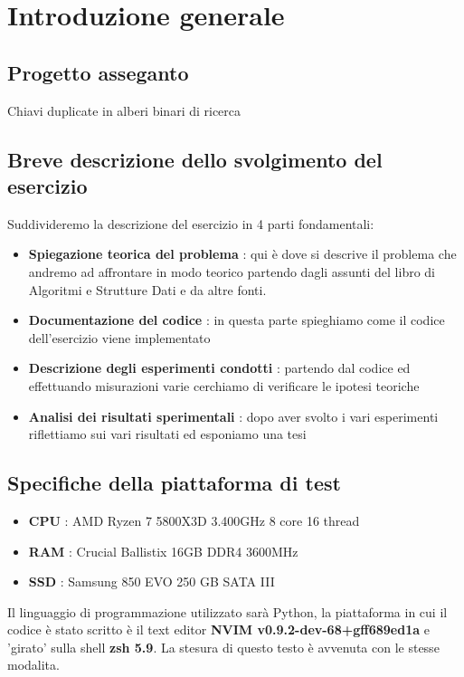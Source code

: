 \section{Introduzione generale}

\subsection{Progetto asseganto}

Chiavi duplicate in alberi binari di ricerca

\subsection{Breve descrizione dello svolgimento del esercizio}
Suddivideremo la descrizione del esercizio in 4 parti fondamentali:

\begin{itemize}
    \item \textbf{Spiegazione teorica del problema} : qui è dove si descrive il problema che andremo ad affrontare in modo teorico partendo dagli assunti del libro di Algoritmi e Strutture Dati e da altre fonti.
    \item \textbf{Documentazione del codice} : in questa parte spieghiamo come il codice dell'esercizio viene implementato 
    \item \textbf{Descrizione degli esperimenti condotti} : partendo dal codice ed effettuando misurazioni varie cerchiamo di verificare le ipotesi teoriche
    \item \textbf{Analisi dei risultati sperimentali} : dopo aver svolto i vari esperimenti riflettiamo sui vari risultati ed esponiamo una tesi
\end{itemize}

\subsection{Specifiche della piattaforma di test}

\begin{itemize}
    \item \textbf{CPU} : AMD Ryzen 7 5800X3D 3.400GHz 8 core 16 thread
    \item \textbf{RAM} : Crucial Ballistix 16GB DDR4 3600MHz
    \item \textbf{SSD} : Samsung 850 EVO 250 GB SATA III
\end{itemize}

Il linguaggio di programmazione utilizzato sarà Python, la piattaforma in cui il codice è stato scritto è il text editor \textbf{NVIM v0.9.2-dev-68+gff689ed1a} e 'girato' sulla shell \textbf{zsh 5.9}. La stesura di questo testo è avvenuta con le stesse modalita.
